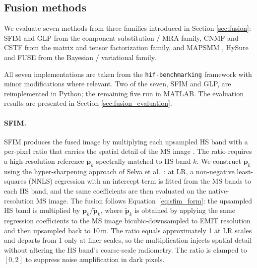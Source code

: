 
\subsection{Fusion methods}
\label{subsec:fusion_methods_proposed}

We evaluate seven methods from three families introduced in Section \ref{sec:fusion}: SFIM \cite{liu2000smoothing} and GLP \cite{aiazzi2006mtf} from the component substitution / MRA family, CNMF \cite{yokoya2012cnmf} and CSTF \cite{li2018fusing} from the matrix and tensor factorization family, and MAPSMM \cite{hardie2004map}, HySure \cite{simoes2015hysure} and FUSE \cite{wei2015fuse} from the Bayesian / variational family.

All seven implementations are taken from the \texttt{hif-benchmarking} framework \cite{hif_review_2022} with minor modifications where relevant. Two of the seven, SFIM and GLP, are reimplemented in Python; the remaining five run in MATLAB. The evaluation results are presented in Section \ref{sec:fusion_evaluation}.

\paragraph{SFIM.}
SFIM produces the fused image by multiplying each upsampled HS band with a per-pixel ratio that carries the spatial detail of the MS image \cite{liu2000smoothing}. The ratio requires a high-resolution reference \(\mathbf{p}_k\) spectrally matched to HS band \(k\). We construct \(\mathbf{p}_k\) using the hyper-sharpening approach of Selva et al.\ \cite{selva2015hyper}: at LR, a non-negative least-squares (NNLS) regression with an intercept term is fitted from the MS bands to each HS band, and the same coefficients are then evaluated on the native-resolution MS image. The fusion follows Equation~\ref{eq:sfim_form}: the upsampled HS band is multiplied by \(\mathbf{p}_k / \widetilde{\mathbf{p}}_k\), where \(\widetilde{\mathbf{p}}_k\) is obtained by applying the same regression coefficients to the MS image bicubic-downsampled to EMIT resolution and then upsampled back to 10\,m. The ratio equals approximately 1 at LR scales and departs from 1 only at finer scales, so the multiplication injects spatial detail without altering the HS band's coarse-scale radiometry. The ratio is clamped to \([0, 2]\) to suppress noise amplification in dark pixels.

